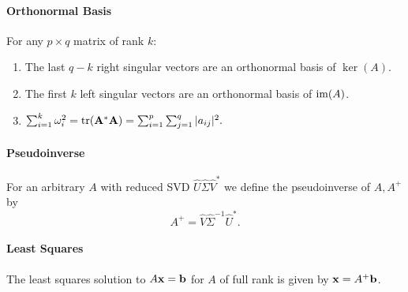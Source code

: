 \paragraph{Orthonormal Basis}
For any \(p \times q\) matrix of rank \(k\):
\begin{enumerate}[label = \alph*)]
    \item The last \(q -k\) right singular vectors are an orthonormal basis of \(\ker(A)\).
    \item The first \(k\) left singular vectors are an orthonormal basis of \(\operatorname{im}(A)\).
    \item \(\sum_{i=1}^k \omega_i^2 = \tr(\mathbf{A}^*\mathbf{A}) = \sum_{i=1}^p\sum_{j=1}^q |a_{ij}|^2.\)
\end{enumerate}

\paragraph{Pseudoinverse}
For an arbitrary \(A\) with reduced SVD \(\hat{U}\hat{\Sigma}\hat{V}^*\) we define the pseudoinverse of \(A, A^+\) by
\[A^+ = \hat{V}\hat{\Sigma}^{-1}\hat{U}^*.\]

\paragraph{Least Squares}
The least squares solution to \(A\mathbf{x} = \mathbf{b}\) for \(A\) of full rank is given by \(\mathbf{x} = A^+\mathbf{b}\).